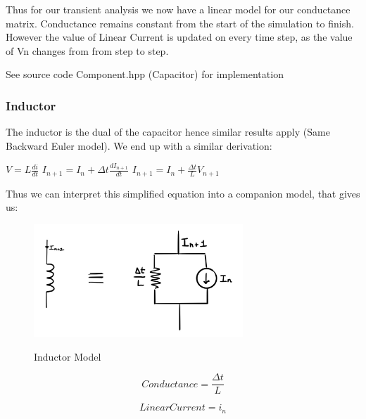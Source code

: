 \documentclass{article}
\begin{document}
\bigbreak 

Thus for our transient analysis we now have a linear model for our conductance matrix. Conductance remains constant from the start of the simulation to finish. However the value of Linear Current is updated on every time step, as the value of Vn changes from from step to step.

See source code Component.hpp (Capacitor) for implementation
\bigbreak 

\subsubsection{Inductor}
The inductor is the dual of the capacitor hence similar results apply (Same Backward Euler model). We end up with a similar derivation:
\bigbreak

$V = L\frac{di}{dt}$
\medbreak
$I_{n+1} = I_n + \Delta t\frac{dI_{n+1}}{dt}$
\medbreak
$I_{n+1} = I_n + \frac{\Delta t}{L}V_{n+1}$

\bigbreak

Thus we can interpret this simplified equation into a companion model, that gives us: 

\bigbreak

\begin{figure}[h]
    \caption{Inductor Model}
    \centering
    \includegraphics[width=0.7\textwidth]{images/InductorModel.jpg}
    \label{fig:InductorModel}
\end{figure}

\noindent\begin{minipage}{.5\linewidth}
\setcounter{equation}{0}
\begin{equation}
  Conductance = \frac{\Delta t}{L}
\end{equation}
\end{minipage}%
\begin{minipage}{.5\linewidth}
\begin{equation}
  LinearCurrent = i_n
\end{equation}
\end{minipage}
\end{document}
